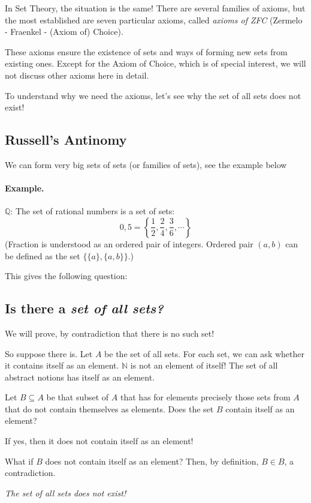 \documentclass[11pt,paper=b5,footinclude,headinclude]{scrbook} %
\theoremstyle{remark}
\theoremstyle{definition} %
\theoremstyle{theorem} %
\begin{document}
In Set Theory, the situation is the same! There are several families of axioms, but the most established are seven particular axioms, called {\em axioms of ZFC} (Zermelo - Fraenkel - (Axiom of) Choice).

These axioms ensure the existence of sets and ways of forming new sets from existing ones.
Except for the Axiom of Choice, which is of special interest, we will not discuss other axioms here in detail.

To understand why we need the axioms, let's see why the set of all sets does not exist!

\subsection*{Russell's Antinomy}

We can form very big sets of sets (or families of sets), see the example below

\paragraph{Example.}  $\mathbb{Q}$: The set of rational numbers is a set of sets:
$$0,5 = \left\{\frac{1}{2}, \frac{2}{4}, \frac{3}{6}, \cdots\right\}$$
(Fraction is understood as an ordered pair of integers. Ordered pair $ (a, b) $ can be defined as the set $\{\{a \}, \{a, b \} \} $.)

This gives the following question:
\subsection*{Is there a {\em set of all sets?}}

We will prove, by contradiction that there is no such set!

So suppose there is. Let $ A $ be the set of all sets.
For each set, we can ask whether it contains itself as an element. $\mathbb{N} $ is not an element of itself!
The set of all abstract notions has itself as an element.

Let $B \subseteq A $ be that subset of $A$ that has for elements precisely those sets from $A$ that do not contain themselves as elements.
Does the set $B$ contain itself as an element?

If yes, then it does not contain itself as an element!

What if $ B $ does not contain itself as an element? Then, by definition, $ B \in B $, a contradiction.

{\em The set of all sets does not exist!}
\end{document}
